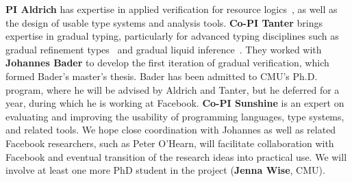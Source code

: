 \documentclass[10pt,twocolumn]{article}
\begin{document}
\begin{sloppypar}
\textbf{PI Aldrich} has expertise in applied verification for resource logics~\cite{PatternsSeparationLogic,ObjectPropositions}, as well as the design of usable type systems and analysis tools.  \textbf{Co-PI Tanter} brings expertise in gradual typing, particularly for advanced typing disciplines such as gradual refinement types~\cite{lehmannTanter:popl2017} and gradual liquid inference~\cite{vazouAl:oopsla2018}.  They worked with \textbf{Johannes Bader} to develop the first iteration of gradual verification, which formed Bader's master's thesis.  Bader has been admitted to CMU's Ph.D. program, where he will be advised by Aldrich and Tanter, but he deferred for a year, during which he is working at Facebook.  \textbf{Co-PI Sunshine} is an expert on evaluating and improving the usability of programming languages, type systems, and related tools.  We hope close coordination with Johannes as well as related Facebook researchers, such as Peter O'Hearn, will facilitate collaboration with Facebook and eventual transition of the research ideas into practical use. We will involve at least one more PhD student in the project (\textbf{Jenna Wise}, CMU).




\end{sloppypar}
\end{document}

